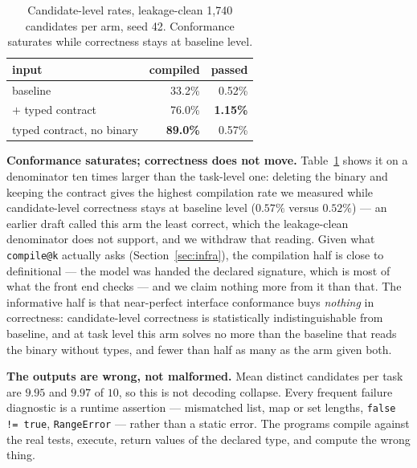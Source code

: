 \documentclass[conference]{IEEEtran}
\makeatletter
\newcommand{\compileatk}{\texttt{compile@k}\xspace}
\makeatother
\begin{document}
\begin{table}[t]
\caption{Candidate-level rates, leakage-clean 1{,}740 candidates per arm, seed
42. Conformance saturates while correctness stays at baseline level.}
\label{tab:candlevel}
\centering\footnotesize
\begin{tabular}{@{}lrr@{}}
\toprule
\textbf{input} & \textbf{compiled} & \textbf{passed}\\
\midrule
baseline                     & 33.2\% & 0.52\%\\
$+$ typed contract           & 76.0\% & \textbf{1.15\%}\\
typed contract, no binary    & \textbf{89.0\%} & 0.57\%\\
\bottomrule
\end{tabular}
\end{table}

\textbf{Conformance saturates; correctness does not move.}
Table~\ref{tab:candlevel} shows it on a denominator ten times larger than the
task-level one: deleting the binary and keeping the contract gives the highest
compilation rate we measured while candidate-level correctness stays at baseline
level ($0.57\%$ versus $0.52\%$) --- an earlier draft called this arm the least
correct, which the leakage-clean denominator does not support, and we withdraw
that reading. Given what \compileatk actually asks
(Section~\ref{sec:infra}), the compilation half is close to definitional --- the
model was handed the declared signature, which is most of what the front end
checks --- and we claim nothing more from it than that. The informative half is
that near-perfect interface conformance buys \emph{nothing} in correctness:
candidate-level correctness is statistically indistinguishable from baseline, and
at task level this arm solves no more than the baseline that reads the binary
without types, and fewer than half as many as the arm given both.

\textbf{The outputs are wrong, not malformed.} Mean distinct candidates per task
are $9.95$ and $9.97$ of $10$, so this is not decoding collapse. Every frequent
failure diagnostic is a runtime assertion --- mismatched list, map or set
lengths, \texttt{false != true}, \texttt{RangeError} --- rather than a static
error. The programs compile against the real tests, execute, return values of the
declared type, and compute the wrong thing.
\end{document}
